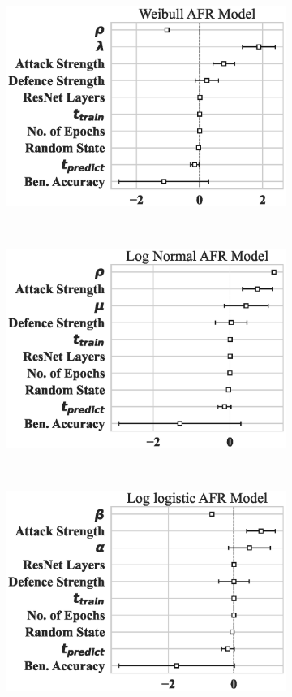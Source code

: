 \begin{figure}
	\begin{subfigure}{0.32\textwidth}
		\centering
		\includegraphics[width=\textwidth]{cifar100_weibull_aft.eps}
	\end{subfigure}%
	~
	\begin{subfigure}{0.32\textwidth}
		\centering
		\includegraphics[width=\textwidth]{cifar100_log_normal_aft.eps}
	\end{subfigure}
	~
	\begin{subfigure}{0.32\textwidth}
		\centering
		\includegraphics[width=\textwidth]{cifar100_log_logistic_aft.eps}

\end{subfigure}
\end{figure}
